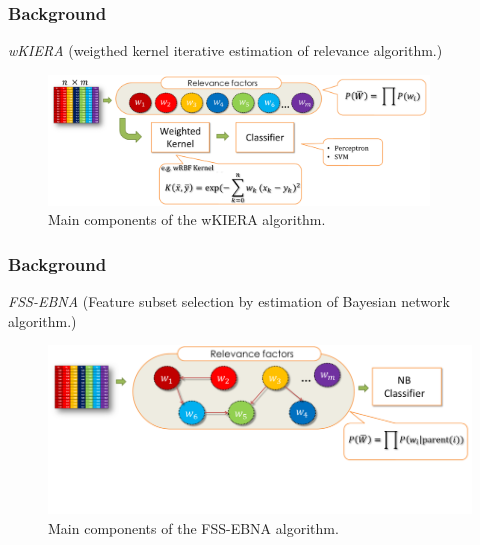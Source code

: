 \begin{frame}
\frametitle{Background}
\emph{wKIERA} (weigthed kernel iterative estimation of relevance algorithm.)
		\begin{figure}[h]
			\centering
				\includegraphics[width=0.9\textwidth]{../Images/wkiera.png}
			\caption{Main components of the wKIERA algorithm.}
			\label{fig:wkiera}
		\end{figure}
\end{frame}
\begin{frame}
\frametitle{Background}
\emph{FSS-EBNA} (Feature subset selection by estimation of Bayesian network algorithm.)
			\begin{figure}[h]
		\centering
			\includegraphics{../Images/FSSEBNA.png}
		\caption{Main components of the FSS-EBNA algorithm.}
		\label{fig:im06}
		\end{figure}
\end{frame}